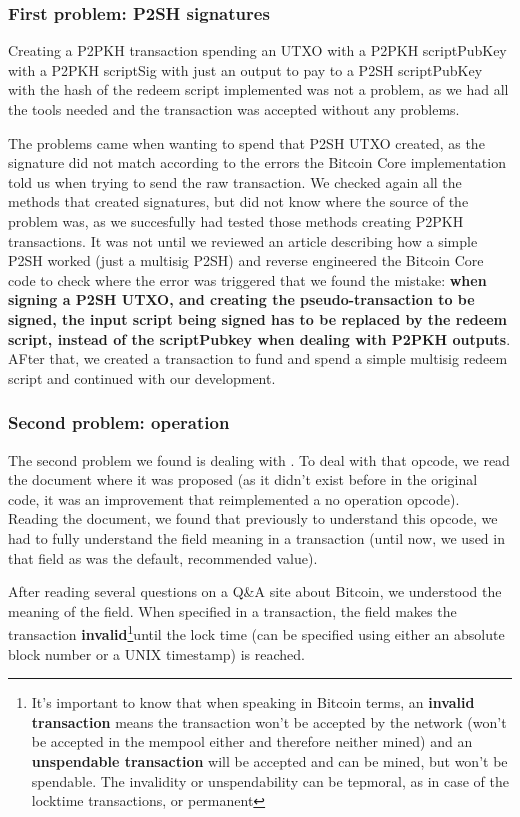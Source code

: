 \subsubsection{First problem: P2SH signatures}
Creating a P2PKH transaction spending an UTXO with a P2PKH scriptPubKey with a P2PKH scriptSig with just an output to pay to a P2SH scriptPubKey with the hash of the redeem script implemented was not a problem, as we had all the tools needed and the transaction was accepted without any problems.

The problems came when wanting to spend that P2SH UTXO created, as the signature did not match according to the errors the Bitcoin Core implementation told us when trying to send the raw transaction. We checked again all the methods that created signatures, but did not know where the source of the problem was, as we succesfully had tested those methods creating P2PKH transactions. It was not until we reviewed an article describing how a simple P2SH worked (just a multisig P2SH)\cite{soroushjp-multisig:online} and reverse engineered the Bitcoin Core code to check where the error was triggered\cite{bitcoin-core:online} that we found the mistake: \textbf{when signing a P2SH UTXO, and creating the pseudo-transaction to be signed, the input script being signed has to be replaced by the redeem script, instead of the scriptPubkey when dealing with P2PKH outputs}. AFter that, we created a transaction to fund and spend a simple multisig redeem script and continued with our development.

\subsubsection{Second problem:  operation}
The second problem we found is dealing with . To deal with that opcode, we read the document where it was proposed\cite{bip-65:online} (as it didn't exist before in the original code, it was an improvement that reimplemented a no operation opcode). Reading the document, we found that previously to understand this opcode, we had to fully understand the  field meaning in a transaction (until now, we used  in that field as was the default, recommended value). 

After reading several questions on a Q&A site about Bitcoin\cite{se-locktime-persist:online, se-locktime-understanding:online}, we understood the meaning of the field. When specified in a transaction, the field makes the transaction \textbf{invalid}\footnote{It's important to know that when speaking in Bitcoin terms, an \textbf{invalid transaction} means the transaction won't be accepted by the network (won't be accepted in the mempool either and therefore neither mined) and an \textbf{unspendable transaction} will be accepted and can be mined, but won't be spendable. The invalidity or unspendability can be tepmoral, as in case of the locktime transactions, or permanent}until the lock time (can be specified using either an absolute block number or a UNIX timestamp) is reached.


